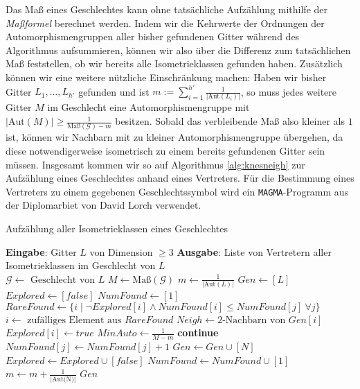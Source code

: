 \documentclass[12pt,a4paper,halfparskip,headsepline,bibtotocnumbered]{scrreprt}
\theoremstyle{nummermitklammern}
\theoremstyle{nonumberbreak}
\newcommand{\Aut}{\text{Aut}}
\begin{document}
Das Maß eines Geschlechtes kann ohne tatsächliche Aufzählung mithilfe der \textit{Maßformel} berechnet werden. Indem wir die Kehrwerte der Ordnungen der Automorphismengruppen aller bisher gefundenen Gitter während des Algorithmus aufsummieren, können wir also über die Differenz zum tatsächlichen Maß feststellen, ob wir bereits alle Isometrieklassen gefunden haben. Zusätzlich können wir eine weitere nützliche Einschränkung machen: Haben wir bisher Gitter $L_1, \dots, L_{h'}$ gefunden und ist $m := \sum_{i=1}^{h'} \frac{1}{\vert \Aut(L_i) \vert}$, so muss jedes weitere Gitter $M$ im Geschlecht eine Automorphismengruppe mit $\vert \Aut(M) \vert \geq \frac{1}{\text{Maß}(\mathcal{G}) - m}$ besitzen. Sobald das verbleibende Maß also kleiner als $1$ ist, können wir Nachbarn mit zu kleiner Automorphismengruppe übergehen, da diese notwendigerweise isometrisch zu einem bereits gefundenen Gitter sein müssen. Insgesamt kommen wir so auf Algorithmus \eqref{alg:knesneigh} zur Aufzählung eines Geschlechtes anhand eines Vertreters. Für die Bestimmung eines Vertreters zu einem gegebenen Geschlechtssymbol wird ein \texttt{MAGMA}-Programm aus der Diplomarbiet von David Lorch \cite{lorch} verwendet.

\begin{algorithm}[H]
	\caption{Aufzählung aller Isometrieklassen eines Geschlechtes}\label{alg:knesneigh}
	\begin{algorithmic}[1]
		\State \textbf{Eingabe}: Gitter $L$ von Dimension $\geq 3$
		\State \textbf{Ausgabe}: Liste von Vertretern aller Isometrieklassen im Geschlecht von $L$
		\\
		\State $\mathcal{G} \gets \text{ Geschlecht von } L$
		\State $M \gets \text{Maß}(\mathcal{G})$
		\State $m \gets \frac{1}{\vert \Aut (L) \vert}$
		\State $Gen \gets \left[ L\right]$
		\State $Explored \gets \left[ false \right]$
		\State $NumFound \gets \left[ 1 \right]$
			\State $RareFound \gets \lbrace i \mid \neg Explored[i] \wedge NumFound[i] \leq NumFound[j]\  \forall j\rbrace$
			\State $i \gets \text{ zufälliges Element aus } RareFound$
			\State $Neigh \gets 2\text{-Nachbarn von } Gen[i]$
			\State $Explored[i] \gets true$
				\State $MinAuto \gets \frac{1}{M-m}$
				\If {$\vert \Aut(N) \vert < MinAuto$}
					\State \textbf{continue}
				\EndIf
					\State $NumFound[j] \gets NumFound[j] + 1$
				\Else
					\State $Gen \gets Gen \cup \left[ N \right]$
					\State $Explored \gets Explored \cup \left[ false \right]$
					\State $NumFound \gets NumFound \cup \left[ 1 \right]$
					\State $m \gets m + \frac{1}{\vert \text{Aut(N)} \vert}$
				\EndIf
			\EndFor
		\EndWhile
		\State \Return $Gen$
	\end{algorithmic}
\end{algorithm}
\end{document}
